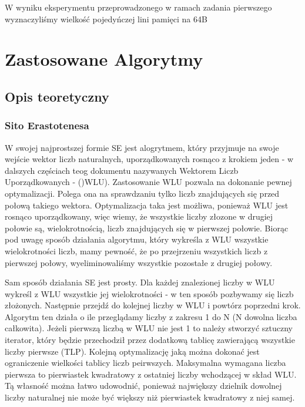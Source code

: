 \documentclass{article}
\begin{document}
                W wyniku eksperymentu przeprowadzonego w ramach zadania pierwszego wyznaczyliśmy wielkość pojedyńczej lini pamięci na 64B
        
    \section{Zastosowane Algorytmy}
        \subsection{Opis teoretyczny}
            \subsubsection{Sito Erastotenesa}
                W swojej najprostszej formie \gls{SE} jest alogrytmem, który przyjmuje na swoje wejście wektor liczb naturalnych, uporządkowanych rosnąco z krokiem jeden - w dalszych częściach teog dokumentu nazywanych Wektorem Liczb Uporządkowanych - ()\gls{WLU}). Zastosowanie \gls{WLU} pozwala na dokonanie pewnej optymalizacji. Polega ona na sprawdzaniu tylko liczb znajdujących się przed połową takiego wektora. Optymalizacja taka jest możliwa, ponieważ \gls{WLU} jest rosnąco uporządkowany, więc wiemy, że wszystkie liczby złozone w drugiej połowie są, wielokrotnością, liczb znajdujących się w pierwszej połowie. Biorąc pod uwagę sposób działania algorytmu, który wykreśla z \gls{WLU} wszystkie wielokrotności liczb, mamy pewność, że po przejrzeniu wszystkich liczb z pierwszej połowy, wyeliminowaliśmy wszystkie pozostałe z drugiej połowy.
                
                Sam sposób działania \gls{SE} jest prosty. Dla każdej znalezionej liczby w \gls{WLU} wykreśl z \gls{WLU} wszystkie jej wielokrotności - w ten sposób pozbywamy się liczb złożonych. Następnie przejdź do kolejnej liczby w \gls{WLU} i powtórz poprzedni krok. Algorytm ten działa o ile przeglądamy liczby z zakresu 1 do N (N dowolna liczba całkowita). Jeżeli pierwszą liczbą w \gls{WLU} nie jest 1 to należy stworzyć sztuczny iterator, który będzie przechodził przez dodatkową tablicę zawierającą wszystkie liczby pierwsze (\gls{TLP}). Kolejną optymalizację jaką można dokonać jest ograniczenie wielkości tablicy liczb peirwszych. Maksymalna wymagana liczba pierwsza to pierwiastek kwadratowy z ostatniej liczby wchodzącej w skład \gls{WLU}. Tą własność można łatwo udowodnić, ponieważ największy dzielnik dowolnej liczby naturalnej nie może być większy niż pierwiastek kwadratowy z niej samej.
            
\end{document}
